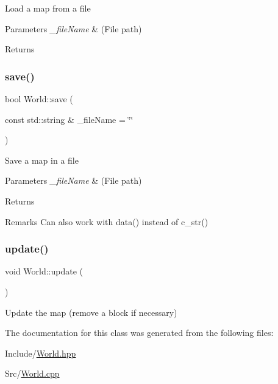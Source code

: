 Load a map from a file 
\begin{DoxyParams}{Parameters}
{\em \+\_\+file\+Name} & (File path) \\
\hline
\end{DoxyParams}
\begin{DoxyReturn}{Returns}

\end{DoxyReturn}
\mbox{\label{class_world_a589deeba74f3e6cfab5ab4427c4255ed}} 
\subsubsection{\texorpdfstring{save()}{save()}}
{\footnotesize\ttfamily bool World\+::save (\begin{DoxyParamCaption}\item[{const std\+::string \&}]{\+\_\+file\+Name = {\ttfamily \char`\"{}\char`\"{}} }\end{DoxyParamCaption})}

Save a map in a file 
\begin{DoxyParams}{Parameters}
{\em \+\_\+file\+Name} & (File path) \\
\hline
\end{DoxyParams}
\begin{DoxyReturn}{Returns}

\end{DoxyReturn}
\begin{DoxyRemark}{Remarks}
Can also work with data() instead of c\+\_\+str() 
\end{DoxyRemark}
\mbox{\label{class_world_aac8c1fde63c06577ffc648aaefdb37f0}} 
\subsubsection{\texorpdfstring{update()}{update()}}
{\footnotesize\ttfamily void World\+::update (\begin{DoxyParamCaption}{ }\end{DoxyParamCaption})}

Update the map (remove a block if necessary) 

The documentation for this class was generated from the following files\+:\begin{DoxyCompactItemize}
\item 
Include/\mbox{\hyperlink{_world_8hpp}{World.\+hpp}}\item 
Src/\mbox{\hyperlink{_world_8cpp}{World.\+cpp}}\end{DoxyCompactItemize}
